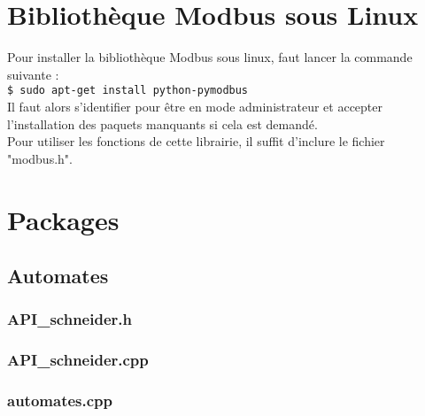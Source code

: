 \documentclass[a4paper,french, titlepage]{book}
\begin{document}
\chapter{Bibliothèque Modbus sous Linux\label{annexe_modbus}}

Pour installer la bibliothèque Modbus sous linux, faut lancer la commande suivante :\\

\qquad \verb!$ sudo apt-get install python-pymodbus! \\

Il faut alors s'identifier pour être en mode administrateur et accepter l'installation des paquets manquants si cela est demandé.\\

Pour utiliser les fonctions de cette librairie, il suffit d'inclure le fichier "modbus.h".




  

\chapter{Packages\label{annexe_packages}}


\section{Automates\label{annexe_packages_automates}}



	\subsection{API\_schneider.h\label{annexe_packages_automates_h}}
	
	

	\subsection{API\_schneider.cpp\label{annexe_packages_automates_cpp}}
	
	

	\subsection{automates.cpp \label{annexe_automates_cpp}}
	
	
\end{document}
